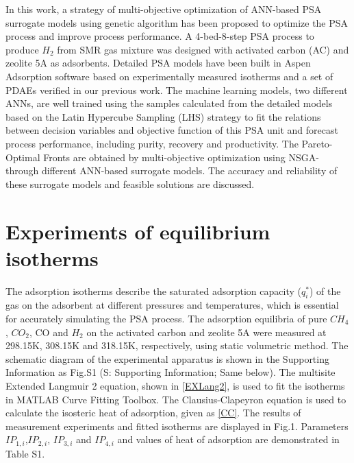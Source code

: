 \documentclass[preprint,12pt]{elsarticle}
\begin{document}
	In this work, a strategy of multi-objective optimization of ANN-based PSA surrogate models using genetic algorithm has been proposed to optimize the PSA process and improve process performance. A 4-bed-8-step PSA process to produce $H_2$ from SMR gas mixture was designed with activated carbon (AC) and zeolite 5A as adsorbents. Detailed PSA models have been built in Aspen Adsorption software based on experimentally measured isotherms and a set of PDAEs verified in our previous work. The machine learning models, two different ANNs, are well trained using the samples calculated from the detailed models based on the Latin Hypercube Sampling (LHS) strategy to fit the relations between decision variables and objective function of this PSA unit and forecast process performance, including purity, recovery and productivity. The Pareto-Optimal Fronts are obtained by multi-objective optimization using NSGA-\uppercase\expandafter{} through different ANN-based surrogate models. The accuracy and reliability of these surrogate models and feasible solutions are discussed.
	\section{Experiments of equilibrium isotherms}
	The adsorption isotherms describe the saturated adsorption capacity ($q_i^*$) of the gas on the adsorbent at different pressures and temperatures, which is essential for accurately simulating the PSA process. The adsorption equilibria of pure $CH_4$, $CO_2$, CO and $H_2$ on the activated carbon and zeolite 5A were measured at 298.15K, 308.15K and 318.15K, respectively, using static volumetric method\cite{RN48,RN49}. The schematic diagram of the experimental apparatus is shown in the Supporting Information as Fig.S1 (S: Supporting Information; Same below). The multisite Extended Langmuir 2 equation\cite{RN50}, shown in  \cref{EXLang2}, is used to fit the isotherms in MATLAB Curve Fitting Toolbox. The Clausius-Clapeyron equation is used to calculate the isosteric heat of adsorption, given as \cref{CC}. The results of measurement experiments and fitted isotherms are displayed in Fig.1. Parameters $IP_{1,i}$,$IP_{2,i}$, $IP_{3,i}$ and $IP_{4,i}$ and values of heat of adsorption are demonstrated in Table S1.
	
\end{document}
